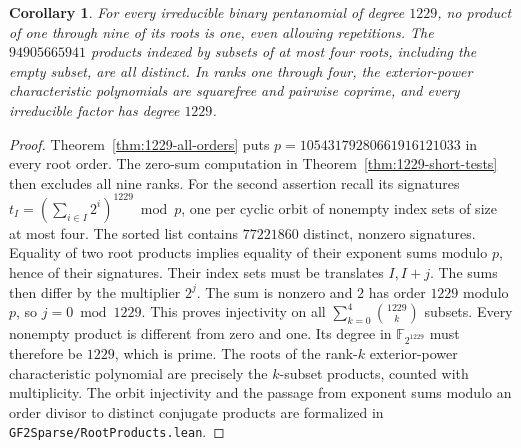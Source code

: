 \documentclass[11pt]{article}
\newtheorem{corollary}[theorem]{Corollary}
\begin{document}
\begin{corollary}\label{cor:1229-all-products}
For every irreducible binary pentanomial of degree \(1229\), no product of
one through nine of its roots is one, even allowing repetitions. The
\(94905665941\) products indexed by subsets of at most four roots,
including the empty subset, are all distinct. In ranks one through
four, the exterior-power characteristic polynomials are squarefree
and pairwise coprime, and every irreducible factor has degree \(1229\).
\end{corollary}
\begin{proof}
Theorem~\ref{thm:1229-all-orders} puts \(p=10543179280661916121033\)
in every root order. The zero-sum computation in
Theorem~\ref{thm:1229-short-tests} then excludes all nine ranks.
For the second assertion recall its signatures
\(t_I=(\sum_{i\in I}2^i)^{1229}\bmod p\), one per cyclic orbit of
nonempty index sets of size at most four. The sorted list contains
\(77221860\) distinct, nonzero signatures. Equality of two root
products implies equality of their exponent sums modulo \(p\), hence
of their signatures. Their index sets must be translates \(I,I+j\).
The sums then differ by the multiplier \(2^j\). The sum is nonzero
and \(2\) has order \(1229\) modulo \(p\), so \(j=0\bmod1229\).
This proves injectivity on all \(\sum_{k=0}^4\binom{1229}{k}\) subsets.
Every nonempty product is different from zero and one. Its degree
in \(\mathbb F_{2^{1229}}\) must therefore be \(1229\), which is prime.
The roots of the rank-\(k\) exterior-power characteristic polynomial
are precisely the \(k\)-subset products, counted with multiplicity.
The orbit injectivity and the passage from exponent sums modulo an
order divisor to distinct conjugate products are formalized in
\nolinkurl{GF2Sparse/RootProducts.lean}.
\end{proof}
\end{document}
